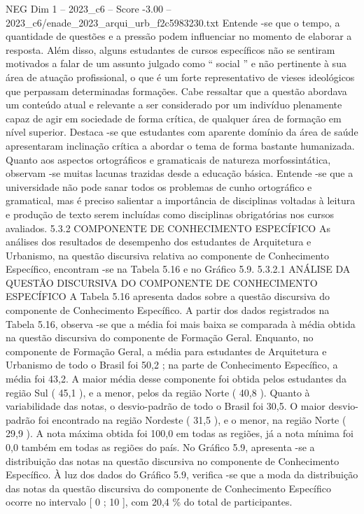 \begin{textsample}{NEG Dim 1 – 2023\_c6 – Score -3.00 – 2023\_c6/enade\_2023\_arqui\_urb\_f2c5983230.txt}
Entende -se que o tempo, a quantidade de questões e a pressão podem influenciar no momento de elaborar a resposta.
Além disso, alguns estudantes de cursos específicos não se sentiram motivados a falar de um assunto julgado como “ social ” e não pertinente à sua área de atuação profissional, o que é um forte representativo de vieses ideológicos que perpassam determinadas formações.
Cabe ressaltar que a questão abordava um conteúdo atual e relevante a ser considerado por um indivíduo plenamente capaz de agir em sociedade de forma crítica, de qualquer área de formação em nível superior.
Destaca -se que estudantes com aparente domínio da área de saúde apresentaram inclinação crítica a abordar o tema de forma bastante humanizada.
Quanto aos aspectos ortográficos e gramaticais de natureza morfossintática, observam -se muitas lacunas trazidas desde a educação básica.
Entende -se que a universidade não pode sanar todos os problemas de cunho ortográfico e gramatical, mas é preciso salientar a importância de disciplinas voltadas à leitura e produção de texto serem incluídas como disciplinas obrigatórias nos cursos avaliados. 5.3.2 COMPONENTE DE CONHECIMENTO ESPECÍFICO As análises dos resultados de desempenho dos estudantes de Arquitetura e Urbanismo, na questão discursiva relativa ao componente de Conhecimento Específico, encontram -se na Tabela 5.16 e no Gráfico 5.9. 5.3.2.1 ANÁLISE DA QUESTÃO DISCURSIVA DO COMPONENTE DE CONHECIMENTO ESPECÍFICO A Tabela 5.16 apresenta dados sobre a questão discursiva do componente de Conhecimento Específico.
A partir dos dados registrados na Tabela 5.16, observa -se que a média foi mais baixa se comparada à média obtida na questão discursiva do componente de Formação Geral.
Enquanto, no componente de Formação Geral, a média para estudantes de Arquitetura e Urbanismo de todo o Brasil foi 50,2 ; na parte de Conhecimento Específico, a média foi 43,2.
A maior média desse componente foi obtida pelos estudantes da região Sul ( 45,1 ), e a menor, pelos da região Norte ( 40,8 ).
Quanto à variabilidade das notas, o desvio-padrão de todo o Brasil foi 30,5.
O maior desvio-padrão foi encontrado na região Nordeste ( 31,5 ), e o menor, na região Norte ( 29,9 ).
A nota máxima obtida foi 100,0 em todas as regiões, já a nota mínima foi 0,0 também em todas as regiões do país.
No Gráfico 5.9, apresenta -se a distribuição das notas na questão discursiva no componente de Conhecimento Específico.
À luz dos dados do Gráfico 5.9, verifica -se que a moda da distribuição das notas da questão discursiva do componente de Conhecimento Específico ocorre no intervalo [ 0 ; 10 ], com 20,4 \% do total de participantes.

\end{textsample}
